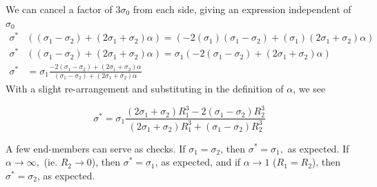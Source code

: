 We can cancel a factor of $3\sigma_0$ from each side, giving an expression independent of $\sigma_0$
\begin{displaymath}
    \begin{split}
        \sigma^*&
        \left(
            (\sigma_1 - \sigma_2)
            + (2\sigma_1 + \sigma_2)\alpha
        \right)
        =
        \left(
            -2(\sigma_1)(\sigma_1 - \sigma_2)
            +(\sigma_1)(2\sigma_1 + \sigma_2)\alpha
        \right)
        \\
        \sigma^*&
        \left(
            (\sigma_1 - \sigma_2)
            + (2\sigma_1 + \sigma_2)\alpha
        \right)
        =
        \sigma_1\left(
            -2(\sigma_1 - \sigma_2)
            +(2\sigma_1 + \sigma_2)\alpha
        \right)
        \\
        \sigma^*&
        =
        \sigma_1 \frac{
            -2(\sigma_1 - \sigma_2)
            +(2\sigma_1 + \sigma_2)\alpha
        }
        {
            (\sigma_1 - \sigma_2)
            + (2\sigma_1 + \sigma_2)\alpha
        }
    \end{split}
\end{displaymath}
With a slight re-arrangement and substituting in the definition of $\alpha$, we see
\begin{mdframed}[backgroundcolor=gray!10, innertopmargin=0pt, innerbottommargin=10pt]
\begin{equation}
    \sigma^*
        =
        \sigma_1 \frac{
            (2\sigma_1 + \sigma_2)R_1^3
            -2(\sigma_1 - \sigma_2)R_2^3
        }
        {
            (2\sigma_1 + \sigma_2)R_1^3
            +(\sigma_1 - \sigma_2) R_2^3
        }
    \label{eq:sigma*}
\end{equation}
\end{mdframed}

A few end-members can serve as checks. If $\sigma_1=\sigma_2$, then $\sigma^* = \sigma_1,$ as expected. If $\alpha \to \infty,$ (ie. $R_2 \to 0$), then $\sigma^* = \sigma_1$, as expected, and if $\alpha \to 1$ ($R_1 = R_2$), then $\sigma^* = \sigma_2$, as expected.
